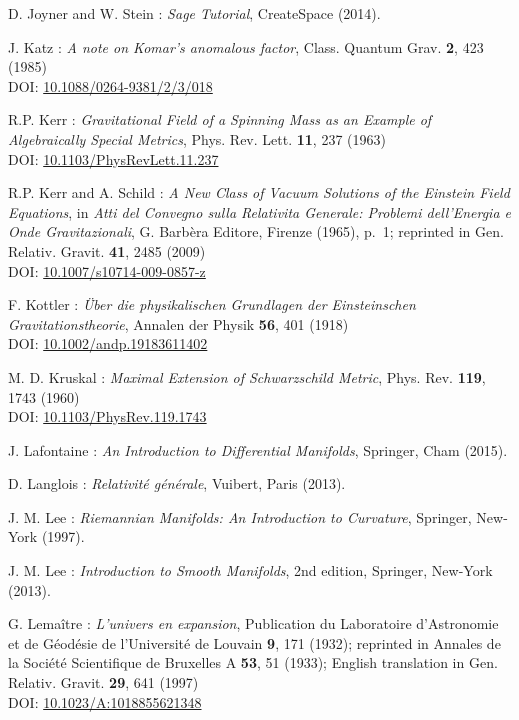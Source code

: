 \begin{thebibliography}{123}
D. Joyner and W. Stein : {\em Sage Tutorial}, CreateSpace (2014).

J. Katz :
{\em A note on Komar's anomalous factor},
Class. Quantum Grav. {\bf 2}, 423 (1985)\\
DOI: \href{http://dx.doi.org/10.1088/0264-9381/2/3/018}{10.1088/0264-9381/2/3/018}

R.P. Kerr :
{\em Gravitational Field of a Spinning Mass as an Example of Algebraically Special Metrics},
Phys. Rev. Lett. {\bf 11}, 237 (1963)\\
DOI: \href{http://dx.doi.org/10.1103/PhysRevLett.11.237}{10.1103/PhysRevLett.11.237}

R.P. Kerr and A. Schild :
{\em A New Class of Vacuum Solutions of the Einstein Field Equations},
in {\em Atti del Convegno sulla Relativita Generale: Problemi
dell’Energia e Onde Gravitazionali}, G. Barbèra Editore,
Firenze (1965), p.~1; reprinted in
Gen. Relativ. Gravit. {\bf 41}, 2485 (2009)\\
DOI: \href{http://dx.doi.org/10.1007/s10714-009-0857-z}{10.1007/s10714-009-0857-z}

F.  Kottler :
{\em \"Uber die physikalischen Grundlagen der Einsteinschen Gravitationstheorie},
Annalen der Physik {\bf 56}, 401 (1918)\\
DOI: \href{http://dx.doi.org/10.1002/andp.19183611402}{10.1002/andp.19183611402}

M. D. Kruskal :
{\em Maximal Extension of Schwarzschild Metric},
Phys. Rev. {\bf 119}, 1743 (1960)\\
DOI: \href{https://doi.org/10.1103/PhysRev.119.1743}{10.1103/PhysRev.119.1743}

J. Lafontaine : {\em An Introduction to Differential Manifolds},
Springer, Cham (2015).

D. Langlois : \emph{Relativit\'e g\'en\'erale},
Vuibert, Paris (2013).

J. M. Lee : {\em Riemannian Manifolds: An Introduction to Curvature},
Springer, New-York (1997).

J. M. Lee : {\em Introduction to Smooth Manifolds}, 2nd edition,
Springer, New-York (2013).

G. Lemaître : {\em L'univers en expansion},
Publication du Laboratoire d'Astronomie et de Géodésie de l'Université
de Louvain {\bf 9},  171 (1932); reprinted in
Annales de la Société Scientifique de Bruxelles A {\bf 53}, 51 (1933);
English translation in
Gen. Relativ. Gravit. {\bf 29}, 641 (1997)\\
DOI: \href{http://dx.doi.org/10.1023/A:1018855621348}{10.1023/A:1018855621348}


\end{thebibliography}
